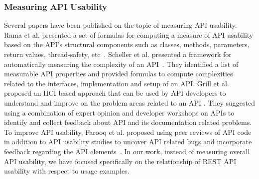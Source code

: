 \documentclass[conference]{IEEEtran}
\begin{document}
\subsubsection{Measuring API Usability}
Several papers have been published on the topic of measuring API usability. Rama et al. presented a set of formulas for computing a measure of API usability based on the API's structural components such as classes, methods, parameters, return values, thread-safety, etc~\cite{rama}. Scheller et al. presented a framework for automatically measuring the complexity of an API~\cite{scheller2015automated}. They identified a list of measurable API properties and provided formulas to compute complexities related to the interfaces, implementation and setup of an API. Grill et al. proposed an HCI based approach that can be used by API developers to understand and improve on the problem areas related to an API \cite{Grill2012}. They suggested using a combination of expert opinion and developer workshops on APIs to identify and collect feedback about API and its documentation related problems. To improve API usability, Farooq et al. proposed using peer reviews of API code in addition to API usability studies to uncover API related bugs and incorporate feedback regarding the API elements~\cite{Farooq:2010:AUP:1753326.1753677}. In our work, instead of measuring overall API usability, we have focused specifically on the relationship of REST API usability with respect to usage examples.
\end{document}
